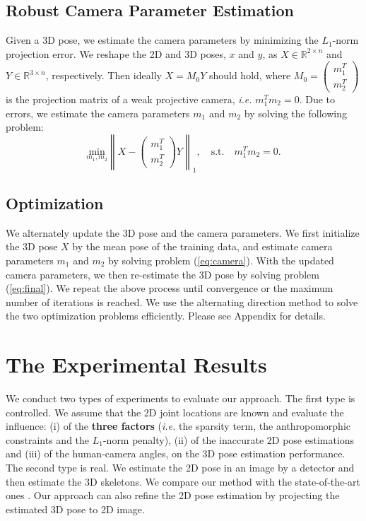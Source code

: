 \documentclass[10pt,twocolumn,letterpaper]{article}
\begin{document}
\subsection{Robust Camera Parameter Estimation}
\label{sec:camera_sec} Given a 3D pose, we estimate the camera
parameters by minimizing the $L_1$-norm projection error. We
reshape the 2D and 3D poses, $x$ and $y$, as $X \in \mathbb{R}^{2
\times n}$ and $Y \in \mathbb{R}^{3 \times n}$, respectively. Then
ideally $X=M_0Y$ should hold, where $ M_0=\left(
\begin{array}{c}m_1^T
\\ m_2^T\end{array}\right)$ is the projection matrix of a weak
projective camera, {\em i.e.} $m_1^Tm_2=0$. Due to errors, we estimate the camera parameters $m_1$ and $m_2$ by solving the
following problem:
\begin{equation}
\underset{m_1, m_2}{\text{min}} \left\| X-\left(
\begin{array}{c}
m_1^T \\
m_2^T
\end{array} \right)Y \right\|_1 ,\quad \text{s.t.}
\quad m_1^Tm_2=0. \label{eq:camera}
\end{equation}

\subsection{Optimization}
We alternately update the 3D pose and the camera parameters. We
first initialize the 3D pose $X$ by the mean pose of the
training data, and estimate camera parameters $m_1$ and $m_2$ by
solving problem (\ref{eq:camera}). With the updated camera
parameters, we then re-estimate the 3D pose by solving problem
(\ref{eq:final}). We repeat the above process until convergence or
the maximum number of iterations is reached. We use the
alternating direction method to solve the two optimization
problems efficiently. Please see Appendix for details.


\section{The Experimental Results}
\label{sec:experiment} We conduct two types of experiments to
evaluate our approach. The first type is controlled. We assume
that the 2D joint locations are known and evaluate
the influence: (i) of the \textbf{three factors} ({\em i.e.} the sparsity term,
the anthropomorphic constraints and the $L_1$-norm penalty), (ii) of
the inaccurate 2D pose estimations and (iii) of the human-camera angles, on
the 3D pose estimation performance. The second type is real. We
estimate the 2D pose in an image by a detector \cite{Yang2D} and then estimate the 3D skeletons. We compare our
method with the state-of-the-art ones \cite{Ramakrishna}
\cite{SimoSerraCVPR2012} \cite{Daubney}. Our approach can also
refine the 2D pose estimation by projecting the estimated 3D pose
to 2D image.
\end{document}
